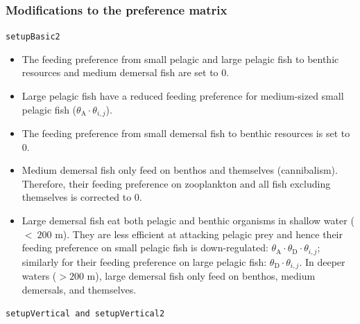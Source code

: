 \documentclass[
]{article}
\begin{document}
\subsubsection{Modifications to the preference
matrix}\label{modifications-to-the-preference-matrix}

\texttt{setupBasic2}

\begin{itemize}
\item
  The feeding preference from small pelagic and large pelagic fish to
  benthic resources and medium demersal fish are set to 0.
\item
  Large pelagic fish have a reduced feeding preference for medium-sized
  small pelagic fish (\(\theta_{\mathrm{A}} \cdot \theta_{i,j}\)).
\item
  The feeding preference from small demersal fish to benthic resources
  is set to 0.
\item
  Medium demersal fish only feed on benthos and themselves
  (cannibalism). Therefore, their feeding preference on zooplankton and
  all fish excluding themselves is corrected to 0.
\item
  Large demersal fish eat both pelagic and benthic organisms in shallow
  water (\(<~200\) m). They are less efficient at attacking pelagic prey
  and hence their feeding preference on small pelagic fish is
  down-regulated:
  \(\theta_{\mathrm{A}} \cdot \theta_{\mathrm{D}} \cdot \theta_{i,j}\);
  similarly for their feeding preference on large pelagic fish:
  \(\theta_{\mathrm{D}} \cdot \theta_{i,j}\). In deeper waters (\(>200\)
  m), large demersal fish only feed on benthos, medium demersals, and
  themselves.
\end{itemize}

\texttt{setupVertical\ and\ setupVertical2}
\end{document}
